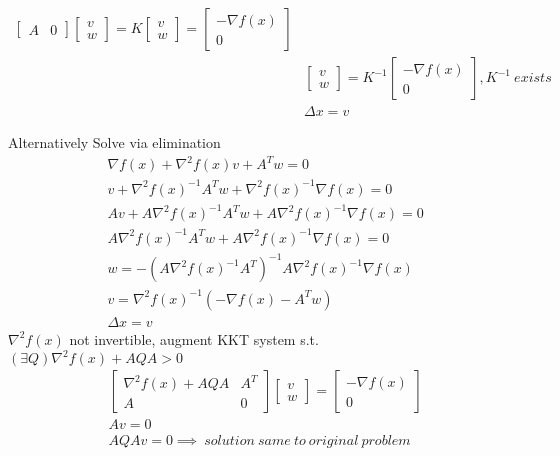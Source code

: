 \documentclass[8pt]{report}
\begin{document}
\begin{multicols*}{2}
\begin{align*}
\begin{bmatrix}
        A & 0 
      \end{bmatrix}
      \begin{bmatrix}
        v\\ w
      \end{bmatrix}=
            K
      \begin{bmatrix}
        v\\ w
      \end{bmatrix} =
    \begin{bmatrix}
        -\nabla f(x)\\
        0
      \end{bmatrix}\\
    &\begin{bmatrix}
        v\\ w
      \end{bmatrix} = K^{-1}
      \begin{bmatrix}
        -\nabla f(x)\\
        0
      \end{bmatrix}, K^{-1}\ exists\\
    &\Delta x = v
  \end{align*}
  
  Alternatively Solve via elimination
  \begin{align*}
    &\nabla f(x) + \nabla^2 f(x) v + A^T w = 0\\
    &v + \nabla^2 f(x)^{-1} A^T w + \nabla^2 f(x)^{-1} \nabla f(x)=0\\
    &Av + A \nabla^2 f(x)^{-1} A^T w + A \nabla^2 f(x)^{-1} \nabla f(x)=0\\
    &A \nabla^2 f(x)^{-1} A^T w + A \nabla^2 f(x)^{-1} \nabla f(x)=0\\
    &w = - (A \nabla^2 f(x)^{-1} A^T)^{-1} A \nabla^2 f(x)^{-1} \nabla f(x)\\
    &v = \nabla^2 f(x)^{-1} (-\nabla f(x) - A^T w)\\
    &\Delta x = v
  \end{align*}
  $\nabla^2 f(x)$ not invertible, augment KKT system s.t.\\
  $(\exists Q) \nabla^2 f(x) + AQA > 0$
  \begin{align*}
    &\begin{bmatrix}
      \nabla^2 f(x) + AQA & A^T \\
      A & 0 
    \end{bmatrix}
    \begin{bmatrix}
      v\\ w
    \end{bmatrix} =
    \begin{bmatrix}
      -\nabla f(x)\\
      0
    \end{bmatrix}\\
    &Av=0\\
    &AQAv = 0 \implies\ solution\ same\ to\ original\ problem
  \end{align*}
  

\end{multicols*}
\end{document}
